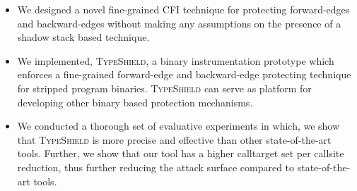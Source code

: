 \label{Contribution}
\begin{itemize}
[leftmargin=.35cm]

 \item 
 We designed a novel fine-grained CFI technique for protecting forward-edges and backward-edges 
 without making any assumptions on the presence of a shadow stack based technique.
 
 \item 
 We implemented, \textsc{TypeShield}, a binary instrumentation prototype which enforces a fine-grained forward-edge and backward-edge protecting technique
 for stripped program binaries. \textsc{TypeShield} can serve as platform for developing other binary based protection mechanisms.
 
 \item 
 We conducted a thorough set of evaluative experiments in which, we show that \textsc{TypeShield} is more precise and effective than 
 other state-of-the-art tools. Further, we show that our tool has a higher calltarget set per callsite reduction, thus 
 further reducing the attack surface compared to state-of-the-art tools.
 
\end{itemize}
